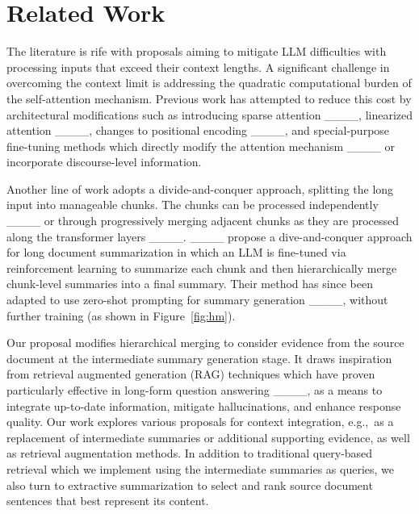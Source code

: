 \section{Related Work}
\label{sec:related_work}


The literature is rife with proposals aiming to  mitigate LLM difficulties with processing inputs that exceed their context lengths. A significant challenge in overcoming the context limit is addressing the quadratic computational
burden of the self-attention mechanism. Previous work has 
attempted to reduce this cost by architectural modifications such as introducing sparse attention ____, linearized attention ____,  changes to positional encoding ____,  and special-purpose fine-tuning methods which directly modify the attention mechanism ____  or incorporate discourse-level information. %

Another line of work adopts a divide-and-conquer approach, splitting the long input into manageable chunks. The chunks can be processed independently ____ or through progressively merging adjacent chunks as they
are processed along the transformer layers ____. 
____ propose a dive-and-conquer approach for long document summarization in which an LLM is fine-tuned via reinforcement learning to summarize each chunk and then hierarchically merge
chunk-level summaries  into a final summary. Their method has since been adapted to use zero-shot prompting for summary generation ____, without further training (as shown in Figure~\ref{fig:hm}). 

Our proposal modifies hierarchical merging to consider evidence from the source document at the intermediate summary generation stage. It draws inspiration from retrieval augmented generation (RAG) techniques which have proven particularly effective in long-form question answering ____, as a means to integrate up-to-date information, mitigate hallucinations, and enhance response quality. Our work explores various proposals for context integration, e.g.,~as a replacement of  intermediate summaries or additional supporting evidence, as well as retrieval augmentation methods. In addition to traditional query-based retrieval which we implement using the intermediate summaries as queries, we also turn to extractive summarization to select and rank source document sentences that best represent its content.  

